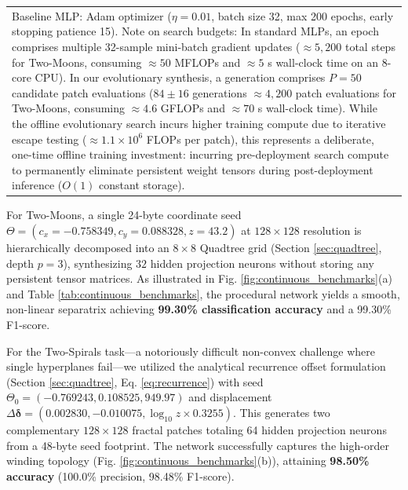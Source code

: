 \documentclass[10pt,journal,compsoc,twocolumn]{article}
\begin{document}
\begin{table}[t]
{\begin{tabular}{lcc}
\multicolumn{3}{p{0.95\columnwidth}}{\footnotesize *Baseline MLP: Adam optimizer ($\eta = 0.01$, batch size 32, max 200 epochs, early stopping patience 15). Note on search budgets: In standard MLPs, an epoch comprises multiple 32-sample mini-batch gradient updates ($\approx 5,200$ total steps for Two-Moons, consuming $\approx 50$ MFLOPs and $\approx 5$ s wall-clock time on an 8-core CPU). In our evolutionary synthesis, a generation comprises $P=50$ candidate patch evaluations ($84 \pm 16$ generations $\approx 4,200$ patch evaluations for Two-Moons, consuming $\approx 4.6$ GFLOPs and $\approx 70$ s wall-clock time). While the offline evolutionary search incurs higher training compute due to iterative escape testing ($\approx 1.1 \times 10^6$ FLOPs per patch), this represents a deliberate, one-time offline training investment: incurring pre-deployment search compute to permanently eliminate persistent weight tensors during post-deployment inference ($O(1)$ constant storage).} \\
\end{tabular}
}
\end{table}

For Two-Moons, a single 24-byte coordinate seed $\Theta = (c_x=-0.758349, c_y=0.088328, z=43.2)$ at $128 \times 128$ resolution is hierarchically decomposed into an $8 \times 8$ Quadtree grid (Section \ref{sec:quadtree}, depth $p=3$), synthesizing $32$ hidden projection neurons without storing any persistent tensor matrices. As illustrated in Fig. \ref{fig:continuous_benchmarks}(a) and Table \ref{tab:continuous_benchmarks}, the procedural network yields a smooth, non-linear separatrix achieving \textbf{99.30\% classification accuracy} and a 99.30\% F1-score.

For the Two-Spirals task---a notoriously difficult non-convex challenge where single hyperplanes fail---we utilized the analytical recurrence offset formulation (Section \ref{sec:quadtree}, Eq. \ref{eq:recurrence}) with seed $\Theta_0 = (-0.769243, 0.108525, 949.97)$ and displacement $\Delta \boldsymbol{\delta} = (0.002830, -0.010075, \log_{10} z \times 0.3255)$. This generates two complementary $128 \times 128$ fractal patches totaling 64 hidden projection neurons from a 48-byte seed footprint. The network successfully captures the high-order winding topology (Fig. \ref{fig:continuous_benchmarks}(b)), attaining \textbf{98.50\% accuracy} (100.0\% precision, 98.48\% F1-score). 
\end{document}
